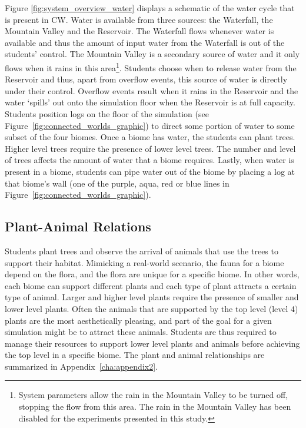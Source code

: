 Figure \ref{fig:system_overview_water} displays a schematic of the water cycle that is present in CW. Water is available from three sources: the Waterfall, the Mountain Valley and the Reservoir. The Waterfall flows whenever water is available and thus the amount of input water from the Waterfall is out of the students' control. The Mountain Valley is a secondary source of water and it only flows when it rains in this area\footnote{System parameters allow the rain in the Mountain Valley to be turned off, stopping the flow from this area. The rain in the Mountain Valley has been disabled for the experiments presented in this study.}. Students choose when to release water from the Reservoir and thus, apart from overflow events, this source of water is directly under their control. Overflow events result when it rains in the Reservoir and the water `spills' out onto the simulation floor when the Reservoir is at full capacity. Students position logs on the floor of the simulation (see Figure~\ref{fig:connected_worlds_graphic}) to direct some portion of water to some subset of the four biomes. Once a biome has water, the students can plant trees. Higher level trees require the presence of lower level trees. The number and level of trees affects the amount of water that a biome requires. Lastly, when water is present in a biome, students can pipe water out of the biome by placing a log at that biome's wall (one of the purple, aqua, red or blue lines in Figure~\ref{fig:connected_worlds_graphic}).



\subsection{Plant-Animal Relations}

Students plant trees and observe the arrival of animals that use the trees to support their habitat. Mimicking a real-world scenario, the fauna for a biome depend on the flora, and the flora are unique for a specific biome. In other words, each biome can support different plants and each type of plant attracts a certain type of animal. Larger and higher level plants require the presence of smaller and lower level plants. Often the animals that are supported by the top level (level 4) plants are the most aesthetically pleasing, and part of the goal for a given simulation might be to attract these animals. Students are thus required to manage their resources to support lower level plants and animals before achieving the top level in a specific biome. The plant and animal relationships are summarized in Appendix~\ref{cha:appendix2}.

